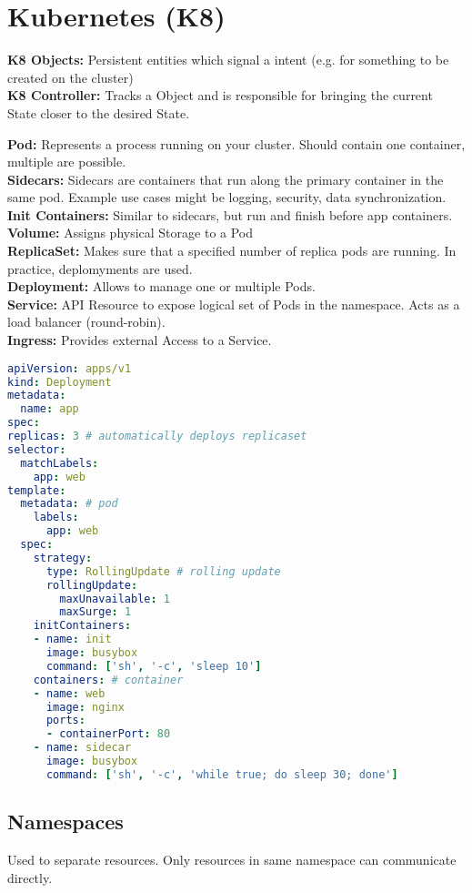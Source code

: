 \section{Kubernetes (K8)}
\begin{mdframed}
	\textbf{K8 Objects:} Persistent entities which signal a intent (e.g. for something to be created on the cluster) \\
	\textbf{K8 Controller:} Tracks a Object and is responsible for bringing the current State closer to the desired State.
\end{mdframed}

\textbf{Pod:} Represents a process running on your cluster. Should contain one container, multiple are possible. \\
\textbf{Sidecars:} Sidecars are containers that run along the primary container in the same pod. Example use cases might be logging, security, data synchronization. \\
\textbf{Init Containers:} Similar to sidecars, but run and finish before app containers.
\textbf{Volume:} Assigns physical Storage to a Pod \\
\textbf{ReplicaSet:} Makes sure that a specified number of replica pods are running. In practice, deplomyments are used. \\
\textbf{Deployment:} Allows to manage one or multiple Pods. \\
\textbf{Service:} API Resource to expose logical set of Pods in the namespace. Acts as a load balancer (round-robin). \\
\textbf{Ingress:} Provides external Access to a Service.
\begin{lstlisting}[language=yaml]
apiVersion: apps/v1
kind: Deployment
metadata:
  name: app
spec:
replicas: 3 # automatically deploys replicaset
selector:
  matchLabels:
    app: web
template:
  metadata: # pod
    labels:
      app: web
  spec:
    strategy:
      type: RollingUpdate # rolling update
      rollingUpdate:
        maxUnavailable: 1
        maxSurge: 1
    initContainers:
    - name: init
      image: busybox
      command: ['sh', '-c', 'sleep 10']
    containers: # container
    - name: web
      image: nginx
      ports:
      - containerPort: 80
    - name: sidecar
      image: busybox
      command: ['sh', '-c', 'while true; do sleep 30; done']
\end{lstlisting}

\subsection{Namespaces}
Used to separate resources. Only resources in same namespace can communicate directly.

